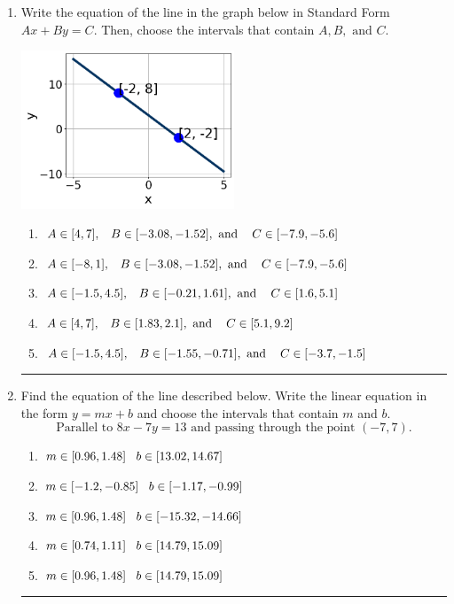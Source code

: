 \documentclass[14pt]{extbook}
\newcommand{\litem}[1]{\item#1\hspace*{-1cm}\rule{\textwidth}{0.4pt}}
\begin{document}
\begin{enumerate}
\litem{
Write the equation of the line in the graph below in Standard Form $Ax+By=C$. Then, choose the intervals that contain $A, B, \text{ and } C$.
\begin{center}
    \includegraphics[width=0.5\textwidth]{../Figures/linearGraphToStandardB.png}
\end{center}
\begin{enumerate}[label=\Alph*.]
\item \( A \in [4, 7], \hspace{3mm} B \in [-3.08, -1.52], \text{ and } \hspace{3mm} C \in [-7.9, -5.6] \)
\item \( A \in [-8, 1], \hspace{3mm} B \in [-3.08, -1.52], \text{ and } \hspace{3mm} C \in [-7.9, -5.6] \)
\item \( A \in [-1.5, 4.5], \hspace{3mm} B \in [-0.21, 1.61], \text{ and } \hspace{3mm} C \in [1.6, 5.1] \)
\item \( A \in [4, 7], \hspace{3mm} B \in [1.83, 2.1], \text{ and } \hspace{3mm} C \in [5.1, 9.2] \)
\item \( A \in [-1.5, 4.5], \hspace{3mm} B \in [-1.55, -0.71], \text{ and } \hspace{3mm} C \in [-3.7, -1.5] \)

\end{enumerate} }
\litem{
Find the equation of the line described below. Write the linear equation in the form $ y=mx+b $ and choose the intervals that contain $m$ and $b$.\[ \text{Parallel to } 8 x - 7 y = 13 \text{ and passing through the point } (-7, 7). \]\begin{enumerate}[label=\Alph*.]
\item \( m \in [0.96, 1.48] \hspace*{3mm} b \in [13.02, 14.67] \)
\item \( m \in [-1.2, -0.85] \hspace*{3mm} b \in [-1.17, -0.99] \)
\item \( m \in [0.96, 1.48] \hspace*{3mm} b \in [-15.32, -14.66] \)
\item \( m \in [0.74, 1.11] \hspace*{3mm} b \in [14.79, 15.09] \)
\item \( m \in [0.96, 1.48] \hspace*{3mm} b \in [14.79, 15.09] \)


\end{enumerate}}
\end{enumerate}
\end{document}
